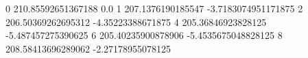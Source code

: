 0 210.85592651367188 0.0
1 207.1376190185547 -3.7183074951171875
2 206.50369262695312 -4.35223388671875
4 205.36846923828125 -5.487457275390625
6 205.40235900878906 -5.4535675048828125
8 208.58413696289062 -2.27178955078125
